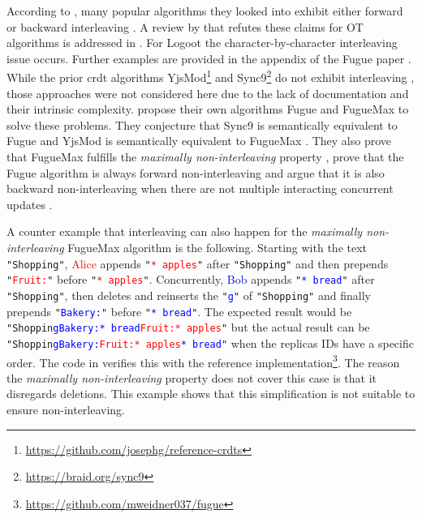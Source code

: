 According to , many popular algorithms they looked into exhibit either forward or backward interleaving \cite[Table 1]{2023-weidner-minimizing-interleaving}. A review by  \cite{2023-sun-critical-examination-fugue-ot,2023-sun-critical-examination-fugue-ot-1,2023-sun-critical-examination-fugue-ot-2,2023-sun-critical-examination-fugue-ot-3} that refutes these claims for OT algorithms is addressed in . For Logoot \cite{2009-weiss-logoot} the character-by-character interleaving issue occurs. Further examples are provided in the appendix of the Fugue paper \cite{2023-weidner-minimizing-interleaving}. While the prior \gls{crdt} algorithms YjsMod\footnote{\url{https://github.com/josephg/reference-crdts}} and Sync9\footnote{\url{https://braid.org/sync9}} do not exhibit interleaving \cite[Table 1]{2023-weidner-minimizing-interleaving}, those approaches were not considered here due to the lack of documentation and their intrinsic complexity.  propose their own algorithms Fugue and FugueMax to solve these problems. They conjecture that Sync9 is semantically equivalent to Fugue and YjsMod is semantically equivalent to FugueMax \cite[Section 6]{2023-weidner-minimizing-interleaving}. They also prove that FugueMax fulfills the \textit{maximally non-interleaving} property \cite[Theorem 9]{2023-weidner-minimizing-interleaving}, prove that the Fugue algorithm is always forward non-interleaving \cite[Lemma 7]{2023-weidner-minimizing-interleaving} and argue that it is also backward non-interleaving when there are not multiple interacting concurrent updates \cite[Section 4.3]{2023-weidner-minimizing-interleaving}.

A counter example that interleaving can also happen for the \textit{maximally non-interleaving} FugueMax algorithm is the following. Starting with the text \texttt{"Shopping"}, \textcolor{red}{Alice} appends \texttt{"\textcolor{red}{*~apples}"} after \texttt{"Shopping"} and then prepends \texttt{"\textcolor{red}{Fruit:}"} before \texttt{"\textcolor{red}{*~apples}"}. Concurrently, \textcolor{blue}{Bob} appends \texttt{"\textcolor{blue}{*~bread}"} after \texttt{"Shopping"}, then deletes and reinserts the \texttt{"\textcolor{blue}{g}"} of \texttt{"Shopping"} and finally prepends \texttt{"\textcolor{blue}{Bakery:}"} before \texttt{"\textcolor{blue}{*~bread}"}. The expected result would be \texttt{"Shoppin\textcolor{blue}{gBakery:*~bread}\textcolor{red}{Fruit:*~apples}"} but the actual result can be \texttt{"Shoppin\textcolor{blue}{gBakery:}\textcolor{red}{Fruit:*~apples}\textcolor{blue}{*~bread}"} when the replicas IDs have a specific order. The code in  verifies this with the reference implementation\footnote{\url{https://github.com/mweidner037/fugue}}. The reason the \textit{maximally non-interleaving} property does not cover this case is that it disregards deletions. This example shows that this simplification is not suitable to ensure non-interleaving.


